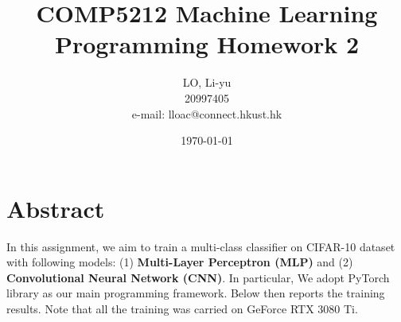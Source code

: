 \documentclass[a4paper,12pt]{article}
\begin{document}
%
   \title{\textbf{COMP5212 Machine Learning} \\  
   Programming Homework 2}
   
   \author{LO, Li-yu \\ 20997405 \\ e-mail: lloac@connect.hkust.hk}
   \date{\today}
   \maketitle

\vspace*{-1.2cm}
\section*{Abstract}
\vspace*{-0.4cm}
In this assignment, we aim to train a multi-class classifier on CIFAR-10 dataset
with following models:
(1) \textbf{Multi-Layer Perceptron (MLP)} and 
(2) \textbf{Convolutional Neural Network (CNN)}.
In particular, We adopt PyTorch library as our main 
programming framework. Below then reports the training results.
Note that all the training was carried on GeForce RTX 3080 Ti.
\vspace*{-0.6cm}
\end{document}
